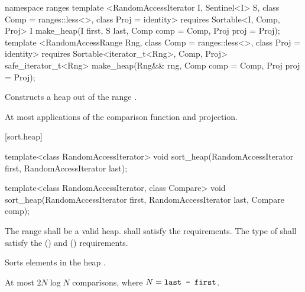 \begin{addedblock}
%
\begin{itemdecl}
namespace ranges {
  template <RandomAccessIterator I, Sentinel<I> S, class Comp = ranges::less<>,
            class Proj = identity>
      requires Sortable<I, Comp, Proj>
    I make_heap(I first, S last, Comp comp = Comp{}, Proj proj = Proj{});
  template <RandomAccessRange Rng, class Comp = ranges::less<>, class Proj = identity>
      requires Sortable<iterator_t<Rng>, Comp, Proj>
    safe_iterator_t<Rng> make_heap(Rng&& rng, Comp comp = Comp{}, Proj proj = Proj{});
}
\end{itemdecl}

\begin{itemdescr}
\pnum
\effects
Constructs a heap out of the range
.

\pnum
\returns {}

\pnum
\complexity
At most
applications of the comparison function and projection.
\end{itemdescr}
\end{addedblock}

[sort.heap]{}

%
\begin{itemdecl}
template<class RandomAccessIterator>
  void sort_heap(RandomAccessIterator first, RandomAccessIterator last);

template<class RandomAccessIterator, class Compare>
  void sort_heap(RandomAccessIterator first, RandomAccessIterator last,
                 Compare comp);
\end{itemdecl}

\begin{itemdescr}
\pnum
\requires The range  shall be a valid heap.
 shall satisfy the
 requirements. The type
of  shall satisfy the
 () and
 () requirements.

\pnum
\effects
Sorts elements in the heap
.

\pnum
\complexity
At most $2N \log N$
comparisons, where
$N = \texttt{last - first}$.
\end{itemdescr}

